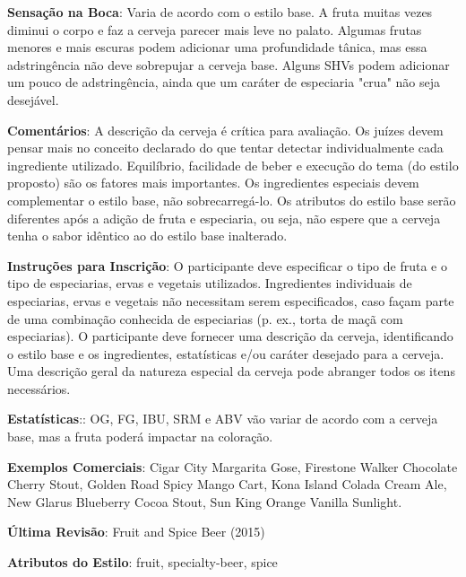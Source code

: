 \textbf{Sensação na Boca}: Varia de acordo com o estilo base. A fruta muitas vezes diminui o corpo e faz a cerveja parecer mais leve no palato. Algumas frutas menores e mais escuras podem adicionar uma profundidade tânica, mas essa adstringência não deve sobrepujar a cerveja base. Alguns SHVs podem adicionar um pouco de adstringência, ainda que um caráter de especiaria "crua" não seja desejável.

\textbf{Comentários}: A descrição da cerveja é crítica para avaliação. Os juízes devem pensar mais no conceito declarado do que tentar detectar individualmente cada ingrediente utilizado. Equilíbrio, facilidade de beber e execução do tema (do estilo proposto) são os fatores mais importantes. Os ingredientes especiais devem complementar o estilo base, não sobrecarregá-lo. Os atributos do estilo base serão diferentes após a adição de fruta e especiaria, ou seja, não espere que a cerveja tenha o sabor idêntico ao do estilo base inalterado.

\textbf{Instruções para Inscrição}: O participante deve especificar o tipo de fruta e o tipo de especiarias, ervas e vegetais utilizados. Ingredientes individuais de especiarias, ervas e vegetais não necessitam serem especificados, caso façam parte de uma combinação conhecida de especiarias (p. ex., torta de maçã com especiarias). O participante deve fornecer uma descrição da cerveja, identificando o estilo base e os ingredientes, estatísticas e/ou caráter desejado para a cerveja. Uma descrição geral da natureza especial da cerveja pode abranger todos os itens necessários.

\textbf{Estatísticas}:: OG, FG, IBU, SRM e ABV vão variar de acordo com a cerveja base, mas a fruta poderá impactar na coloração.

\textbf{Exemplos Comerciais}: Cigar City Margarita Gose, Firestone Walker Chocolate Cherry Stout, Golden Road Spicy Mango Cart, Kona Island Colada Cream Ale, New Glarus Blueberry Cocoa Stout, Sun King Orange Vanilla Sunlight.

\textbf{Última Revisão}: Fruit and Spice Beer (2015)

\textbf{Atributos do Estilo}: fruit, specialty-beer, spice

